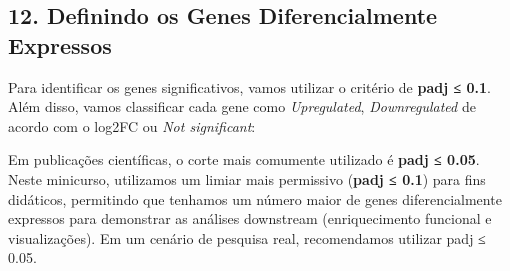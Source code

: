 \documentclass[
  letterpaper,
  DIV=11,
  numbers=noendperiod]{scrreprt}
\newenvironment{Shaded}{\begin{snugshade}}{\end{snugshade}}
\newcommand{\AttributeTok}[1]{\textcolor[rgb]{0.40,0.45,0.13}{#1}}
\newcommand{\CommentTok}[1]{\textcolor[rgb]{0.37,0.37,0.37}{#1}}
\newcommand{\DecValTok}[1]{\textcolor[rgb]{0.68,0.00,0.00}{#1}}
\newcommand{\FloatTok}[1]{\textcolor[rgb]{0.68,0.00,0.00}{#1}}
\newcommand{\FunctionTok}[1]{\textcolor[rgb]{0.28,0.35,0.67}{#1}}
\newcommand{\NormalTok}[1]{\textcolor[rgb]{0.00,0.23,0.31}{#1}}
\newcommand{\OtherTok}[1]{\textcolor[rgb]{0.00,0.23,0.31}{#1}}
\newcommand{\SpecialCharTok}[1]{\textcolor[rgb]{0.37,0.37,0.37}{#1}}
\newcommand{\StringTok}[1]{\textcolor[rgb]{0.13,0.47,0.30}{#1}}
\begin{document}
\subsection{12. Definindo os Genes Diferencialmente
Expressos}\label{definindo-os-genes-diferencialmente-expressos}

Para identificar os genes significativos, vamos utilizar o critério de
\textbf{padj ≤ 0.1}. Além disso, vamos classificar cada gene como
\emph{Upregulated}, \emph{Downregulated} de acordo com o log2FC ou
\emph{Not significant}:

\begin{tcolorbox}[enhanced jigsaw, arc=.35mm, bottomrule=.15mm, bottomtitle=1mm, breakable, colback=white, colbacktitle=quarto-callout-warning-color!10!white, colframe=quarto-callout-warning-color-frame, coltitle=black, left=2mm, leftrule=.75mm, opacityback=0, opacitybacktitle=0.6, rightrule=.15mm, title=\textcolor{quarto-callout-warning-color}{\faExclamationTriangle}\hspace{0.5em}{Nota Didática}, titlerule=0mm, toprule=.15mm, toptitle=1mm]

Em publicações científicas, o corte mais comumente utilizado é
\textbf{padj ≤ 0.05}. Neste minicurso, utilizamos um limiar mais
permissivo (\textbf{padj ≤ 0.1}) para fins didáticos, permitindo que
tenhamos um número maior de genes diferencialmente expressos para
demonstrar as análises downstream (enriquecimento funcional e
visualizações). Em um cenário de pesquisa real, recomendamos utilizar
padj ≤ 0.05.

\end{tcolorbox}

\begin{Shaded}
\end{Shaded}
\end{document}
